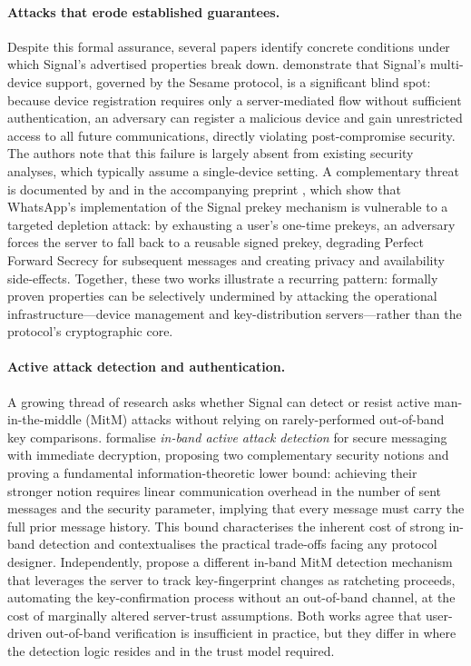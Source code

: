 \paragraph{Attacks that erode established guarantees.}
Despite this formal assurance, several papers identify concrete conditions under which Signal's advertised properties break down. \textcite{wichelmann2021} demonstrate that Signal's multi-device support, governed by the Sesame protocol, is a significant blind spot: because device registration requires only a server-mediated flow without sufficient authentication, an adversary can register a malicious device and gain unrestricted access to all future communications, directly violating post-compromise security. The authors note that this failure is largely absent from existing security analyses, which typically assume a single-device setting. A complementary threat is documented by \textcite{gegenhuber2025} and in the accompanying preprint \parencite{gegenhuber2025b}, which show that WhatsApp's implementation of the Signal prekey mechanism is vulnerable to a targeted depletion attack: by exhausting a user's one-time prekeys, an adversary forces the server to fall back to a reusable signed prekey, degrading Perfect Forward Secrecy for subsequent messages and creating privacy and availability side-effects. Together, these two works illustrate a recurring pattern: formally proven properties can be selectively undermined by attacking the operational infrastructure—device management and key-distribution servers—rather than the protocol's cryptographic core.

\paragraph{Active attack detection and authentication.}
A growing thread of research asks whether Signal can detect or resist active man-in-the-middle (MitM) attacks without relying on rarely-performed out-of-band key comparisons. \textcite{barooti2023} formalise \emph{in-band active attack detection} for secure messaging with immediate decryption, proposing two complementary security notions and proving a fundamental information-theoretic lower bound: achieving their stronger notion requires linear communication overhead in the number of sent messages and the security parameter, implying that every message must carry the full prior message history. This bound characterises the inherent cost of strong in-band detection and contextualises the practical trade-offs facing any protocol designer. Independently, \textcite{teng2024} propose a different in-band MitM detection mechanism that leverages the server to track key-fingerprint changes as ratcheting proceeds, automating the key-confirmation process without an out-of-band channel, at the cost of marginally altered server-trust assumptions. Both works agree that user-driven out-of-band verification is insufficient in practice, but they differ in where the detection logic resides and in the trust model required.

